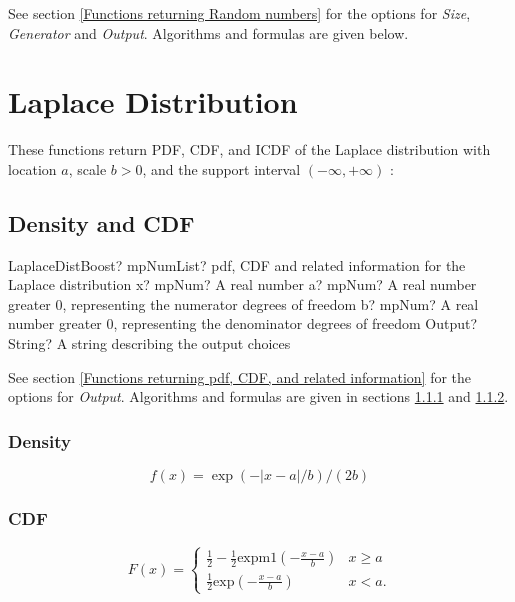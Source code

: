 \vspace{0.3cm}

See section \ref{Functions returning Random numbers} for the options for  {\itshape\sffamily Size},  {\itshape\sffamily Generator} and {\itshape\sffamily Output}. Algorithms and formulas are given below.





\newpage
\section{Laplace Distribution}
These functions return PDF, CDF, and ICDF of the Laplace distribution with location
$a$, scale $b > 0$, and the support interval $(-\infty,+\infty)$ :


\subsection{Density and CDF}
\begin{mpFunctionsExtract}
	\mpFunctionFourNotImplemented
	{LaplaceDistBoost? mpNumList? pdf, CDF and related information for the Laplace distribution}
	{x? mpNum? A real number}
	{a? mpNum? A real number greater 0, representing the numerator  degrees of freedom}
	{b? mpNum? A real number greater 0, representing the denominator degrees of freedom}
	{Output? String? A string describing the output choices}
\end{mpFunctionsExtract}


\vspace{0.3cm}
See section \ref{Functions returning pdf, CDF, and related information} for the options for {\itshape\sffamily Output}. Algorithms and formulas are given in sections \ref{LaplaceDistributionDensity} and \ref{LaplaceDistributionCDF}.


\subsubsection{Density}
\label{LaplaceDistributionDensity}

\begin{equation} 
	f(x)= \exp(- \vert x-a \vert /b)/(2b)
\end{equation}


\subsubsection{CDF}
\label{LaplaceDistributionCDF}

\begin{equation}
	F(x)=\begin{cases}
		\frac{1}{2} - \frac{1}{2} \text{expm1}\left(- \frac{x-a}{b}\right) & x \geq a\\
		\frac{1}{2} \text{exp}\left(- \frac{x-a}{b}\right) & x<a.
	\end{cases}
\end{equation}



